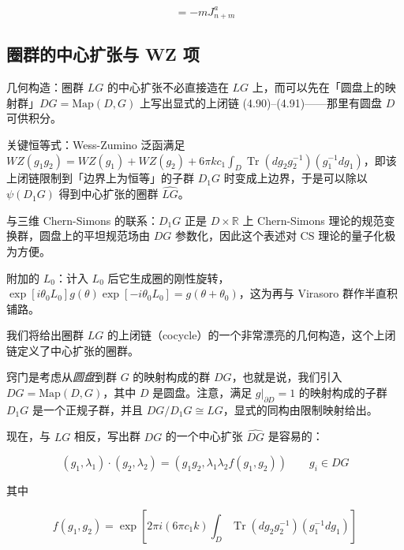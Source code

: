 \begin{equation}
  [L_n,J^a_m]=-mJ^a_{n+m}
  \tag{4.89}
  \label{eq:4.89}
\end{equation}

\subsection{圈群的中心扩张与 WZ 项} %

\begin{keytakeaways}
  \item 几何构造：圈群 $LG$ 的中心扩张不必直接造在 $LG$ 上，而可以先在「圆盘上的映射群」$DG=\mathrm{Map}(D,G)$ 上写出显式的上闭链 (4.90)--(4.91)——那里有圆盘 $D$ 可供积分。
  \item 关键恒等式：Wess-Zumino 泛函满足 $WZ(g_1g_2)=WZ(g_1)+WZ(g_2)+6\pi kc_1\int_D\operatorname{Tr}(dg_2g_2^{-1})(g_1^{-1}dg_1)$，即该上闭链限制到「边界上为恒等」的子群 $D_1G$ 时变成上边界，于是可以除以 $\psi(D_1G)$ 得到中心扩张的圈群 $\widehat{LG}$。
  \item 与三维 Chern-Simons 的联系：$D_1G$ 正是 $D\times\mathbb{R}$ 上 Chern-Simons 理论的规范变换群，圆盘上的平坦规范场由 $DG$ 参数化，因此这个表述对 CS 理论的量子化极为方便。
  \item 附加的 $L_0$：计入 $L_0$ 后它生成圈的刚性旋转，$\exp[i\theta_0L_0]g(\theta)\exp[-i\theta_0L_0]=g(\theta+\theta_0)$，这为再与 Virasoro 群作半直积铺路。
\end{keytakeaways}

我们将给出圈群 $LG$ 的上闭链（cocycle）的一个非常漂亮的几何构造，这个上闭链定义了中心扩张的圈群。

窍门是考虑从\emph{圆盘}到群 $G$ 的映射构成的群 $DG$，也就是说，我们引入 $DG=\mathrm{Map}(D,G)$，其中 $D$ 是圆盘。注意，满足 $g|_{\partial D}=1$ 的映射构成的子群 $D_1G$ 是一个正规子群，并且 $DG/D_1G\cong LG$，显式的同构由限制映射给出。

现在，与 $LG$ 相反，写出群 $DG$ 的一个中心扩张 $\widehat{DG}$ 是容易的：

\begin{equation}
  (g_1,\lambda_1)\cdot(g_2,\lambda_2)=(g_1g_2,\lambda_1\lambda_2f(g_1,g_2))\qquad g_i\in DG
  \tag{4.90}
  \label{eq:4.90}
\end{equation}

其中

\begin{equation}
  f(g_1,g_2)=\exp\left[2\pi i(6\pi c_1k)\int_D\operatorname{Tr}(dg_2g_2^{-1})(g_1^{-1}dg_1)\right]
  \tag{4.91}
  \label{eq:4.91}
\end{equation}

